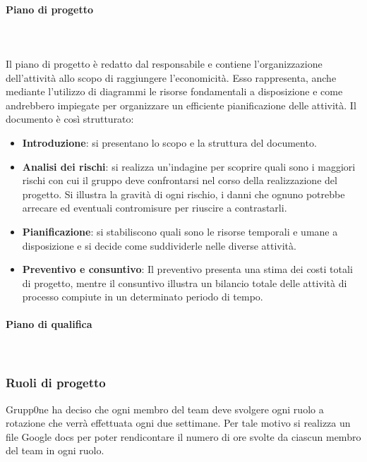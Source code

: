 \documentclass[../norme-di-progetto.tex]{subfiles}
\begin{document}
\paragraph{Piano di progetto}\mbox{}\\
\label{par:piano di progetto}
\\Il piano di progetto è redatto dal responsabile e contiene l'organizzazione dell'attività allo scopo di raggiungere l'economicità. Esso rappresenta, anche mediante l'utilizzo di diagrammi le risorse fondamentali a disposizione e come andrebbero impiegate per organizzare un efficiente pianificazione delle attività. Il documento è così strutturato:
\begin{itemize}
	\item \textbf{Introduzione}: si presentano lo scopo e la struttura del documento.
	\item \textbf{Analisi dei rischi}: si realizza un'indagine per scoprire quali sono i maggiori rischi con cui il gruppo deve confrontarsi nel corso della realizzazione del progetto. Si illustra la gravità di ogni rischio, i danni che ognuno potrebbe arrecare ed eventuali contromisure per riuscire a contrastarli.
	\item \textbf{Pianificazione}: si stabiliscono quali sono le risorse temporali e umane a disposizione e si decide come suddividerle nelle diverse attività.
	\item \textbf{Preventivo e consuntivo}: Il preventivo presenta una stima dei costi totali di progetto, mentre il consuntivo illustra un bilancio totale delle attività di processo compiute in un determinato periodo di tempo.
\end{itemize}
\paragraph{Piano di qualifica}\mbox{}\\
\label{par:piano di qualifica}
\subsubsection{Ruoli di progetto}
\label{subs:ruoli di progetto}
Grupp0ne ha deciso che ogni membro del team deve svolgere ogni ruolo a rotazione che verrà effettuata ogni due settimane. Per tale motivo si realizza un file Google docs per poter rendicontare il numero di ore svolte da ciascun membro del team in ogni ruolo.
\end{document}
